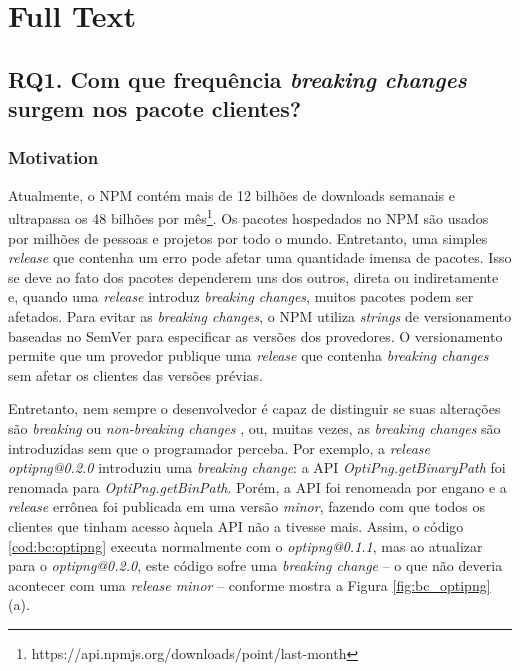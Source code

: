 \chapter{Full Text}

\section{RQ1. Com que frequência \textit{breaking changes} surgem nos pacote clientes?}
\label{sec:rq1}

\subsection{Motivation}
\label{mot:rq1}

Atualmente, o \Gls{NPM} contém mais de 12 bilhões de downloads semanais e ultrapassa os 48 bilhões por mês\footnote{https://api.npmjs.org/downloads/point/last-month}. Os pacotes hospedados no \Gls{NPM} são usados por milhões de pessoas e projetos por todo o mundo. Entretanto, uma simples \textit{release} que contenha um erro pode afetar uma quantidade imensa de pacotes. Isso se deve ao fato dos pacotes dependerem uns dos outros, direta ou indiretamente e, quando uma \textit{release} introduz \textit{breaking changes}, muitos pacotes podem ser afetados. Para evitar as \textit{breaking changes}, o \Gls{NPM} utiliza \textit{strings} de versionamento baseadas no \Gls{SemVer} para especificar as versões dos provedores. O versionamento permite que um provedor publique uma \textit{release} que contenha \textit{breaking changes} sem afetar os clientes das versões prévias.

Entretanto, nem sempre o desenvolvedor é capaz de distinguir se suas alterações são \textit{breaking} ou \textit{non-breaking changes} \cite{noregrets2018}, ou, muitas vezes, as \textit{breaking changes} são introduzidas sem que o programador perceba. Por exemplo, a \textit{release optipng@0.2.0} introduziu uma \textit{breaking change}: a \gls{API} \textit{OptiPng.getBinaryPath} foi renomada para \textit{OptiPng.getBinPath}. Porém, a \gls{API} foi renomeada por engano e a \textit{release} errônea foi publicada em uma versão \textit{minor}, fazendo com que todos os clientes que tinham acesso àquela \gls{API} não a tivesse mais. Assim, o código \ref{cod:bc:optipng} executa normalmente com o \textit{optipng@0.1.1}, mas ao atualizar para o \textit{optipng@0.2.0}, este código sofre uma \textit{breaking change} -- o que não deveria acontecer com uma \textit{release minor}  -- conforme mostra a Figura \ref{fig:bc_optipng} (a).

